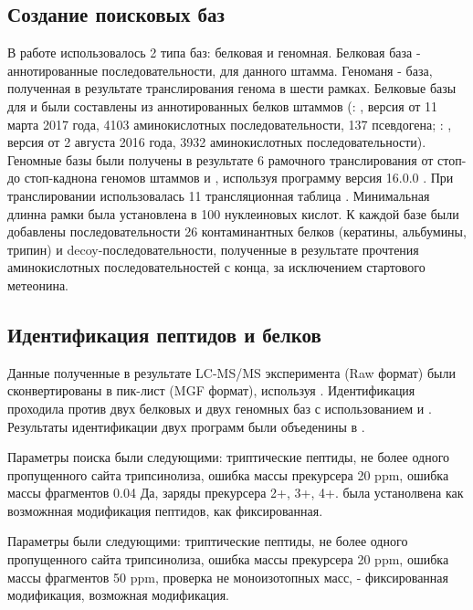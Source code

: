 \subsection{Создание поисковых баз}
В работе использовалось 2 типа баз: белковая и геномная. Белковая база - аннотированные последовательности, для данного штамма. Геноманя - база, полученная в результате транслирования генома в шести рамках.
Белковые базы для  и  были составлены из аннотированных белков штаммов (: , версия от 11 марта 2017 года, 4103 аминокислотных последовательности, 137 псевдогена; : , версия от 2 августа 2016 года, 3932 аминокислотных последовательности).
Геномные базы были получены в результате 6 рамочного транслирования от стоп- до стоп-каднона геномов штаммов  и , используя программу  версия 16.0.0 \cite{rutherford2000artemis}. При транслировании использовалась 11 трансляционная таблица . Минимальная длинна рамки была установлена в 100 нуклеиновых кислот.
К каждой базе были добавлены последовательности 26 контаминантных белков (кератины, альбумины, трипин) и decoy-последовательности, полученные в результате прочтения аминокислотных последовательностей с конца, за исключением стартового метеонина. 

\subsection{Идентификация пептидов и белков}
Данные полученные в результате LC-MS/MS эксперимента (Raw формат) были сконвертированы в пик-лист (MGF формат), используя  \cite{chambers2012cross}. Идентификация проходила против двух белковых и двух геномных баз с использованием  \cite{cottrell1999probability} и  \cite{fenyo2003method}. Результаты идентификации двух программ были объеденины в . 

Параметры поиска  были следующими: триптические пептиды, не более одного пропущенного сайта трипсинолиза, ошибка массы прекурсера 20 ppm, ошибка массы фрагментов 0.04 Да, заряды прекурсера 2+, 3+, 4+.  была устанолвена как возможнная модификация пептидов,  как фиксированная. 

Параметры  были следующими: триптические пептиды, не более одного пропущенного сайта трипсинолиза, ошибка массы прекурсера 20 ppm, ошибка массы фрагментов 50 ppm, проверка не моноизотопных масс,  - фиксированная модификация,  возможная модификация.

